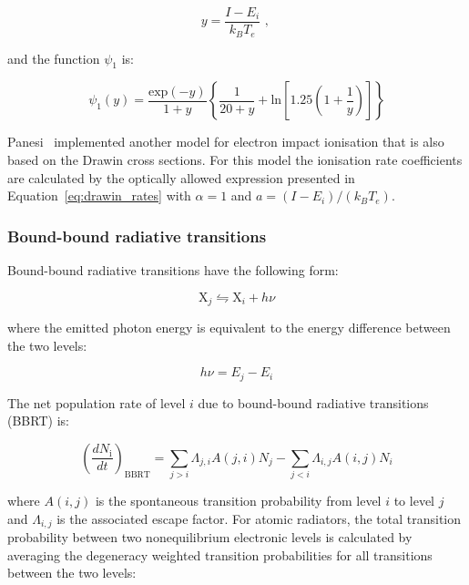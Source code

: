 \begin{equation}
 y = \frac{I - E_i}{k_B T_e} \text{ , }
\end{equation}

\noindent and the function $\psi_1$ is:

\begin{equation}
 \psi_1 ( y ) = \frac{\text{exp}( -y)}{1 + y} \left \lbrace \frac{1}{20 + y} + \text{ln} \left [ 1.25 \left ( 1 + \frac{1}{y} \right ) \right ] \right \rbrace
\end{equation}

Panesi~\cite{panesi_2008a,panesi_phd} implemented another model for electron impact ionisation that is also based on the Drawin cross sections.
For this model the ionisation rate coefficients are calculated by the optically allowed expression presented in Equation~\ref{eq:drawin_rates} with $\alpha=1$ and $a = ( I - E_i ) / ( k_B T_e )$.

\subsubsection{Bound-bound radiative transitions}

Bound-bound radiative transitions have the following form:

\begin{equation}
 \text{X}_j \leftrightharpoons \text{X}_i + h \nu
\end{equation}

\noindent where the emitted photon energy is equivalent to the energy difference between the two levels:

\begin{equation}
 h \nu = E_j - E_i
\end{equation}

The net population rate of level $i$ due to bound-bound radiative transitions (BBRT) is:

\begin{equation}
 \left ( \frac{dN_\text{i}}{dt} \right )_\text{BBRT} =  \sum_{j > i} \Lambda_{j,i} A(j,i) N_j - \sum_{j < i} \Lambda_{i,j} A(i,j) N_i 
\end{equation}

\noindent where $A(i,j)$ is the spontaneous transition probability from level $i$ to level $j$ and $\Lambda_{i,j}$ is the associated escape factor.
For atomic radiators, the total transition probability between two nonequilibrium electronic levels is calculated by averaging the degeneracy weighted transition probabilities for all transitions between the two levels:

